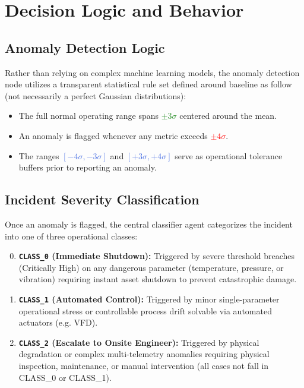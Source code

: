 \documentclass[stu, 12pt, floatsintext]{apa7}
\begin{document}
\section{Decision Logic and Behavior}

\subsection{Anomaly Detection Logic}
Rather than relying on complex machine learning models, the anomaly detection node utilizes a transparent statistical rule set defined around baseline as follow (not necessarily a perfect Gaussian distributions):
\begin{itemize}
	\item The full normal operating range spans \textcolor{ForestGreen}{$\pm 3\sigma$} centered around the mean.	
	\item An anomaly is flagged whenever any metric exceeds \textcolor{red}{$\pm 4\sigma$}.
	\item The ranges \textcolor{RoyalBlue}{$[-4\sigma, -3\sigma]$} and \textcolor{RoyalBlue}{$[+3\sigma, +4\sigma]$} serve as operational tolerance buffers prior to reporting an anomaly.
\end{itemize}

\subsection{Incident Severity Classification}
Once an anomaly is flagged, the central classifier agent categorizes the incident into one of three operational classes:
\begin{enumerate}[font=\large\color{red}]\setcounter{enumi}{-1}
	\item \textbf{\texttt{CLASS\_0} (Immediate Shutdown):} Triggered by severe threshold breaches (Critically High) on any dangerous parameter (temperature, pressure, or vibration) requiring instant asset shutdown to prevent catastrophic damage.
	\item \textbf{\texttt{CLASS\_1} (Automated Control):} Triggered by minor single-parameter operational stress or controllable process drift solvable via automated actuators (e.g. VFD).
	\item \textbf{\texttt{CLASS\_2} (Escalate to Onsite Engineer):} Triggered by physical degradation or complex multi-telemetry anomalies requiring physical inspection, maintenance, or manual intervention (all cases not fall in CLASS\_0 or CLASS\_1).
\end{enumerate}
\end{document}
